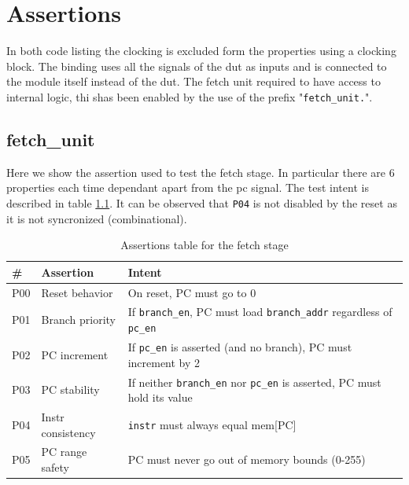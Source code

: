 \chapter{Assertions} 
\label{cha:assertions}

In both code listing the clocking is excluded form the properties using a clocking block.
The binding uses all the signals of the dut as inputs and is connected to the module itself instead of the dut.
The fetch unit required to have access to internal logic, thi shas been enabled by the use of the prefix "\texttt{fetch\_unit.}".

\section{fetch\_unit}

Here we show the assertion used to test the fetch stage. 
In particular there are 6 properties each time dependant apart from the pc signal. 
The test intent is described in table \ref{tab:assertions_fetch}.
It can be observed that \texttt{P04} is not disabled by the reset as it is not syncronized (combinational).

\begin{table}[h]
	\centering
	\begin{tabular}{|l|l|l|}
		\hline
		\textbf{\#} & \textbf{Assertion} & \textbf{Intent} \\ \hline
		P00 		& Reset behavior 	 & On reset, PC must go to 0 \\ \hline
		P01 		& Branch priority	 & If \texttt{branch\_en}, PC must load \texttt{branch\_addr} regardless of \texttt{pc\_en} \\ \hline
		P02 		& PC increment   	 & If \texttt{pc\_en} is asserted (and no branch), PC must increment by 2 \\ \hline
		P03 		& PC stability   	 & If neither \texttt{branch\_en} nor \texttt{pc\_en} is asserted, PC must hold its value \\ \hline
		P04 		& Instr consistency  & \texttt{instr} must always equal mem[PC] \\ \hline
		P05 		& PC range safety 	 & PC must never go out of memory bounds (0-255) \\ \hline
	\end{tabular}
	\caption{Assertions table for the fetch stage}
	\label{tab:assertions_fetch}
\end{table}

